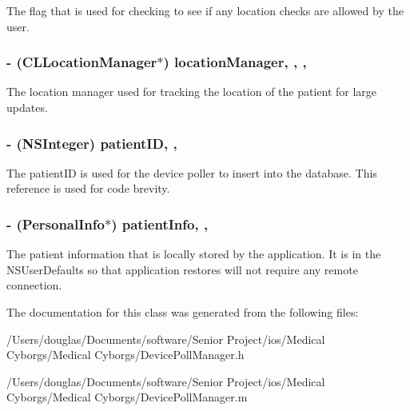 The flag that is used for checking to see if any location checks are allowed by the user. \hypertarget{interface_device_poll_manager_ad710c38392bfc32d3509de470e0cfa8d}{
\subsubsection[{location\-Manager}]{\setlength{\rightskip}{0pt plus 5cm}-\/ (C\-L\-Location\-Manager$\ast$) location\-Manager\hspace{0.3cm}{\ttfamily [read]}, {\ttfamily [write]}, {\ttfamily [atomic]}, {\ttfamily [strong]}}}\label{interface_device_poll_manager_ad710c38392bfc32d3509de470e0cfa8d}
The location manager used for tracking the location of the patient for large updates. \hypertarget{interface_device_poll_manager_a621e3962372201145248997e2eb87327}{
\subsubsection[{patient\-I\-D}]{\setlength{\rightskip}{0pt plus 5cm}-\/ (N\-S\-Integer) patient\-I\-D\hspace{0.3cm}{\ttfamily [read]}, {\ttfamily [write]}, {\ttfamily [atomic]}}}\label{interface_device_poll_manager_a621e3962372201145248997e2eb87327}
The patient\-I\-D is used for the device poller to insert into the database. This reference is used for code brevity. \hypertarget{interface_device_poll_manager_a8739ffcaa2b1e02afc1864e338de148f}{
\subsubsection[{patient\-Info}]{\setlength{\rightskip}{0pt plus 5cm}-\/ ({\bf Personal\-Info}$\ast$) patient\-Info\hspace{0.3cm}{\ttfamily [read]}, {\ttfamily [write]}, {\ttfamily [atomic]}}}\label{interface_device_poll_manager_a8739ffcaa2b1e02afc1864e338de148f}
The patient information that is locally stored by the application. It is in the N\-S\-User\-Defaults so that application restores will not require any remote connection. 

The documentation for this class was generated from the following files\-:\begin{DoxyCompactItemize}
\item 
/\-Users/douglas/\-Documents/software/\-Senior Project/ios/\-Medical Cyborgs/\-Medical Cyborgs/Device\-Poll\-Manager.\-h\item 
/\-Users/douglas/\-Documents/software/\-Senior Project/ios/\-Medical Cyborgs/\-Medical Cyborgs/Device\-Poll\-Manager.\-m\end{DoxyCompactItemize}
